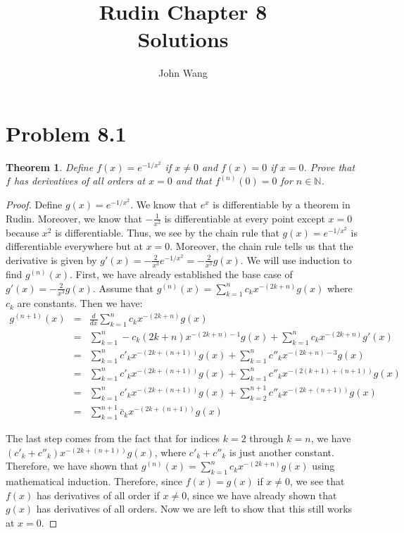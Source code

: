 \documentclass[psamsfonts]{amsart}
\title{Rudin Chapter 8\\
Solutions}
\author{John Wang}
\newtheorem{thm}{Theorem}[section]
\theoremstyle{definition}
\theoremstyle{remark}
\numberwithin{equation}{section}
\begin{document}
\maketitle

\section{Problem 8.1}

\begin{thm}
Define $f(x) = e^{-1/x^2}$ if $x \neq 0$ and $f(x) = 0$ if $x = 0$. Prove that $f$ has derivatives of all orders at $x = 0$ and that $f^{(n)}(0) = 0$ for $n \in \mathbb{N}$.
\end{thm}

\begin{proof}
Define $g(x) = e^{-1/x^2}$. We know that $e^{x}$ is differentiable by a theorem in Rudin. Moreover, we know that $- \frac{1}{x^2}$ is differentiable at every point except $x = 0$ because $x^2$ is differentiable. Thus, we see by the chain rule that $g(x) = e^{-1/x^2}$ is differentiable everywhere but at $x=0$. Moreover, the chain rule tells us that the derivative is given by $g'(x) = - \frac{2}{x^3} e^{-1/x^2} = -\frac{2}{x^3} g(x)$. We will use induction to find $g^(n)(x)$. First, we have already established the base case of $g'(x) = - \frac{2}{x^3} g(x)$. Assume that $g^{(n)}(x) = \sum_{k=1}^n c_k x^{-(2k + n)} g(x)$ where $c_k$ are constants. Then we have:
\begin{eqnarray}
g^{(n+1)}(x) &=& \frac{d}{dx} \sum_{k=1}^n c_k x^{-(2k + n)} g(x) \\
&=& \sum_{k=1}^n -c_k (2k + n) x^{-(2k + n)-1} g(x) + \sum_{k=1}^n c_k x^{-(2k+n)} g'(x) \\
&=& \sum_{k=1}^n c'_k x^{-(2k + (n+1))} g(x) + \sum_{k=1}^n c''_k x^{-(2k + n)- 3} g(x) \\
&=& \sum_{k=1}^{n} c'_k x^{-(2k + (n+1))} g(x) + \sum_{k=1}^n c''_k x^{-(2(k+1)+(n+1))} g(x) \\
&=& \sum_{k=1}^n c'_k x^{-(2k + (n+1))} g(x) + \sum_{k=2}^{n+1} c''_k x^{-(2k + (n+1))} g(x) \\
&=& \sum_{k=1}^{n+1} \bar{c}_k x^{-(2k+(n+1))} g(x)
\end{eqnarray}

The last step comes from the fact that for indices $k=2$ through $k=n$, we have $(c'_k + c''_k) x^{-(2k+(n+1))}g(x)$, where $c'_k + c''_k$ is just another constant. Therefore, we have shown that $g^{(n)}(x) = \sum_{k=1}^n c_k x^{-(2k + n)} g(x)$ using mathematical induction. Therefore, since $f(x) = g(x)$ if $x \neq 0$, we see that $f(x)$ has derivatives of all order if $x \neq 0$, since we have already shown that $g(x)$ has derivatives of all orders. Now we are left to show that this still works at $x = 0$. 


\end{proof}
\end{document}
